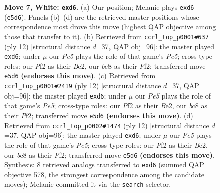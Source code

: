 \documentclass[11pt]{article}
\begin{document}
\begin{figure}[p]
\caption{\textbf{Move 7, White: \texttt{exd6}.} (a) Our position; Melanie plays \texttt{exd6} (\texttt{e5d6}). Panels (b)--(d) are the retrieved master positions whose correspondence most drove this move (highest QAP objective among those that transfer to it). (b) Retrieved from \texttt{ccrl\_top\_p0001\#637} (ply 12) [structural distance $d$=37, QAP obj=96]: the master played \texttt{exd6}; under $\mu$ our \emph{Pe5} plays the role of that game's \emph{Pe5}; cross-type roles: our \emph{P}f2 as their \emph{B}e2, our \emph{b}c8 as their \emph{P}f2; transferred move \texttt{e5d6} \textbf{(endorses this move)}. (c) Retrieved from \texttt{ccrl\_top\_p0001\#2419} (ply 12) [structural distance $d$=37, QAP obj=96]: the master played \texttt{exd6}; under $\mu$ our \emph{Pe5} plays the role of that game's \emph{Pe5}; cross-type roles: our \emph{P}f2 as their \emph{B}e2, our \emph{b}c8 as their \emph{P}f2; transferred move \texttt{e5d6} \textbf{(endorses this move)}. (d) Retrieved from \texttt{ccrl\_top\_p0002\#1474} (ply 12) [structural distance $d$=37, QAP obj=96]: the master played \texttt{exd6}; under $\mu$ our \emph{Pe5} plays the role of that game's \emph{Pe5}; cross-type roles: our \emph{P}f2 as their \emph{B}e2, our \emph{b}c8 as their \emph{P}f2; transferred move \texttt{e5d6} \textbf{(endorses this move)}. Synthesis: 8 retrieved analogs transferred to \texttt{exd6} (summed QAP objective 578, the strongest correspondence among the candidate moves); Melanie committed it via the \texttt{search} selector.}
\label{fig:thought-m12}
\end{figure}

\clearpage
\end{document}
